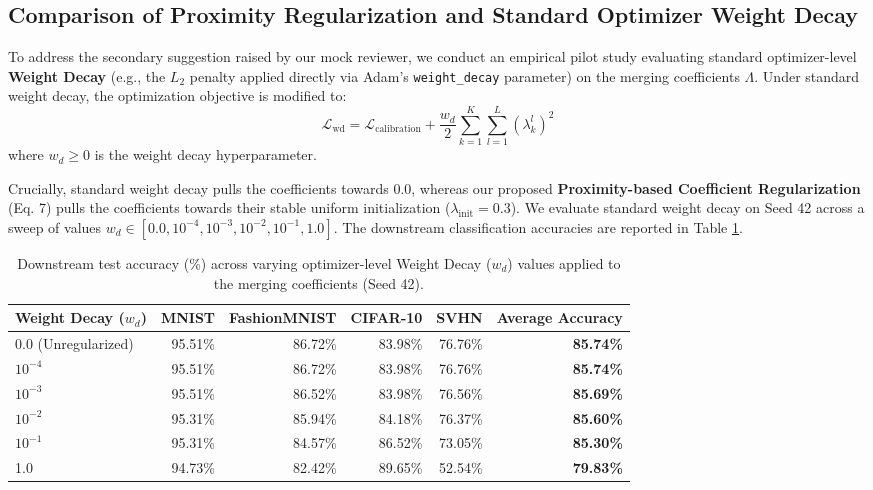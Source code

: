\documentclass{article}
\theoremstyle{plain}
\theoremstyle{definition}
\theoremstyle{remark}
\begin{document}
\subsection{Comparison of Proximity Regularization and Standard Optimizer Weight Decay}
\label{sec:appendix_weight_decay}

To address the secondary suggestion raised by our mock reviewer, we conduct an empirical pilot study evaluating standard optimizer-level \textbf{Weight Decay} (e.g., the $L_2$ penalty applied directly via Adam's \texttt{weight\_decay} parameter) on the merging coefficients $\Lambda$. Under standard weight decay, the optimization objective is modified to:
\begin{equation}
    \mathcal{L}_{\text{wd}} = \mathcal{L}_{\text{calibration}} + \frac{w_d}{2} \sum_{k=1}^K \sum_{l=1}^L (\lambda^l_k)^2
\end{equation}
where $w_d \ge 0$ is the weight decay hyperparameter. 

Crucially, standard weight decay pulls the coefficients towards $0.0$, whereas our proposed \textbf{Proximity-based Coefficient Regularization} (Eq. 7) pulls the coefficients towards their stable uniform initialization ($\lambda_{\text{init}} = 0.3$). We evaluate standard weight decay on Seed 42 across a sweep of values $w_d \in [0.0, 10^{-4}, 10^{-3}, 10^{-2}, 10^{-1}, 1.0]$. The downstream classification accuracies are reported in Table \ref{tab:appendix_weight_decay}.

\begin{table}[h]
\caption{Downstream test accuracy (\%) across varying optimizer-level Weight Decay ($w_d$) values applied to the merging coefficients (Seed 42).}
\label{tab:appendix_weight_decay}
\centering
\begin{tabular}{lrrrrr}
\toprule
\textbf{Weight Decay ($w_d$)} & \textbf{MNIST} & \textbf{FashionMNIST} & \textbf{CIFAR-10} & \textbf{SVHN} & \textbf{Average Accuracy} \\
\midrule
0.0 (Unregularized) & 95.51\% & 86.72\% & 83.98\% & 76.76\% & \textbf{85.74\%} \\
$10^{-4}$ & 95.51\% & 86.72\% & 83.98\% & 76.76\% & \textbf{85.74\%} \\
$10^{-3}$ & 95.51\% & 86.52\% & 83.98\% & 76.56\% & \textbf{85.69\%} \\
$10^{-2}$ & 95.31\% & 85.94\% & 84.18\% & 76.37\% & \textbf{85.60\%} \\
$10^{-1}$ & 95.31\% & 84.57\% & 86.52\% & 73.05\% & \textbf{85.30\%} \\
1.0 & 94.73\% & 82.42\% & 89.65\% & 52.54\% & \textbf{79.83\%} \\
\bottomrule
\end{tabular}
\end{table}
\end{document}
